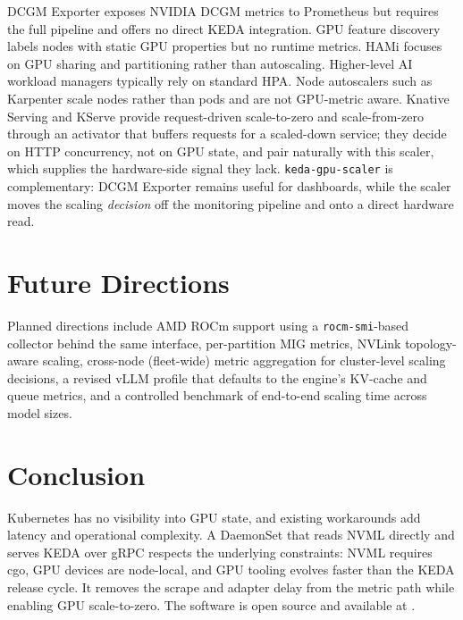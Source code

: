 \documentclass[11pt]{article}
\begin{document}
DCGM Exporter exposes NVIDIA DCGM metrics to Prometheus but requires the full
pipeline and offers no direct KEDA integration. GPU feature discovery labels
nodes with static GPU properties but no runtime metrics. HAMi \cite{hami}
focuses on GPU sharing and partitioning rather than autoscaling. Higher-level AI
workload managers typically rely on standard HPA. Node autoscalers such as
Karpenter scale nodes rather than pods and are not GPU-metric aware. Knative
Serving and KServe provide request-driven scale-to-zero and scale-from-zero
through an activator that buffers requests for a scaled-down service; they
decide on HTTP concurrency, not on GPU state, and pair naturally with this
scaler, which supplies the hardware-side signal they lack.
\texttt{keda-gpu-scaler} is complementary: DCGM Exporter remains useful for
dashboards, while the scaler moves the scaling \emph{decision} off the monitoring
pipeline and onto a direct hardware read.

\section{Future Directions}

Planned directions include AMD ROCm support using a \texttt{rocm-smi}-based
collector behind the same interface, per-partition MIG metrics, NVLink
topology-aware scaling, cross-node (fleet-wide) metric aggregation for
cluster-level scaling decisions, a revised vLLM profile that defaults to the
engine's KV-cache and queue metrics, and a controlled benchmark of end-to-end
scaling time across model sizes.

\section{Conclusion}

Kubernetes has no visibility into GPU state, and existing workarounds add latency
and operational complexity. A DaemonSet that reads NVML directly and serves KEDA
over gRPC respects the underlying constraints: NVML requires cgo, GPU devices
are node-local, and GPU tooling evolves faster than the KEDA release cycle. It
removes the scrape and adapter delay from the metric path while enabling GPU
scale-to-zero. The
software is open source and available at \cite{kgs}.
\end{document}
